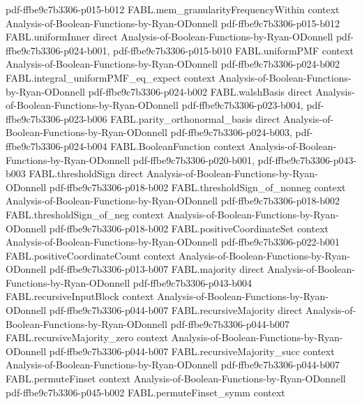 \begin{theorem}
  {pdf-ffbe9c7b3306-p015-b012}
\proofstep
  {FABL.mem_granularityFrequencyWithin}
  {context}
  {Analysis-of-Boolean-Functions-by-Ryan-ODonnell}
  {pdf-ffbe9c7b3306-p015-b012}
\proofstep
  {FABL.uniformInner}
  {direct}
  {Analysis-of-Boolean-Functions-by-Ryan-ODonnell}
  {pdf-ffbe9c7b3306-p024-b001,
    pdf-ffbe9c7b3306-p015-b010}
\proofstep
  {FABL.uniformPMF}
  {context}
  {Analysis-of-Boolean-Functions-by-Ryan-ODonnell}
  {pdf-ffbe9c7b3306-p024-b002}
\proofstep
  {FABL.integral_uniformPMF_eq_expect}
  {context}
  {Analysis-of-Boolean-Functions-by-Ryan-ODonnell}
  {pdf-ffbe9c7b3306-p024-b002}
\proofstep
  {FABL.walshBasis}
  {direct}
  {Analysis-of-Boolean-Functions-by-Ryan-ODonnell}
  {pdf-ffbe9c7b3306-p023-b004,
    pdf-ffbe9c7b3306-p023-b006}
\proofstep
  {FABL.parity_orthonormal_basis}
  {direct}
  {Analysis-of-Boolean-Functions-by-Ryan-ODonnell}
  {pdf-ffbe9c7b3306-p024-b003,
    pdf-ffbe9c7b3306-p024-b004}
\proofstep
  {FABL.BooleanFunction}
  {context}
  {Analysis-of-Boolean-Functions-by-Ryan-ODonnell}
  {pdf-ffbe9c7b3306-p020-b001,
    pdf-ffbe9c7b3306-p043-b003}
\proofstep
  {FABL.thresholdSign}
  {direct}
  {Analysis-of-Boolean-Functions-by-Ryan-ODonnell}
  {pdf-ffbe9c7b3306-p018-b002}
\proofstep
  {FABL.thresholdSign_of_nonneg}
  {context}
  {Analysis-of-Boolean-Functions-by-Ryan-ODonnell}
  {pdf-ffbe9c7b3306-p018-b002}
\proofstep
  {FABL.thresholdSign_of_neg}
  {context}
  {Analysis-of-Boolean-Functions-by-Ryan-ODonnell}
  {pdf-ffbe9c7b3306-p018-b002}
\proofstep
  {FABL.positiveCoordinateSet}
  {context}
  {Analysis-of-Boolean-Functions-by-Ryan-ODonnell}
  {pdf-ffbe9c7b3306-p022-b001}
\proofstep
  {FABL.positiveCoordinateCount}
  {context}
  {Analysis-of-Boolean-Functions-by-Ryan-ODonnell}
  {pdf-ffbe9c7b3306-p013-b007}
\proofstep
  {FABL.majority}
  {direct}
  {Analysis-of-Boolean-Functions-by-Ryan-ODonnell}
  {pdf-ffbe9c7b3306-p043-b004}
\proofstep
  {FABL.recursiveInputBlock}
  {context}
  {Analysis-of-Boolean-Functions-by-Ryan-ODonnell}
  {pdf-ffbe9c7b3306-p044-b007}
\proofstep
  {FABL.recursiveMajority}
  {direct}
  {Analysis-of-Boolean-Functions-by-Ryan-ODonnell}
  {pdf-ffbe9c7b3306-p044-b007}
\proofstep
  {FABL.recursiveMajority_zero}
  {context}
  {Analysis-of-Boolean-Functions-by-Ryan-ODonnell}
  {pdf-ffbe9c7b3306-p044-b007}
\proofstep
  {FABL.recursiveMajority_succ}
  {context}
  {Analysis-of-Boolean-Functions-by-Ryan-ODonnell}
  {pdf-ffbe9c7b3306-p044-b007}
\proofstep
  {FABL.permuteFinset}
  {context}
  {Analysis-of-Boolean-Functions-by-Ryan-ODonnell}
  {pdf-ffbe9c7b3306-p045-b002}
\proofstep
  {FABL.permuteFinset_symm}
  {context}

\end{theorem}
